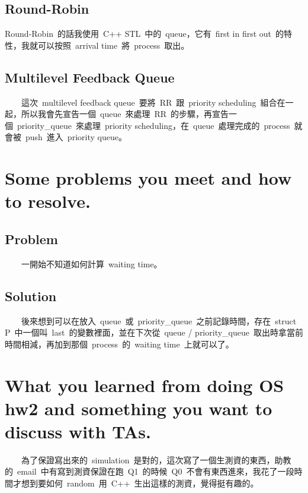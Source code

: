 \documentclass[12pt, a4paper]{article}
\begin{document}
\begin{CJK*}{UTF8}{bsmi}
        \subsection{Round-Robin}
            Round-Robin\ 的話我使用\ C++ STL\ 中的\ queue，它有\ first in first out\ 的特性，我就可以按照\ arrival time\ 將\ process\ 取出。

        \subsection{Multilevel Feedback Queue}
            　　這次\ multilevel feedback queue\ 要將\ RR\ 跟\ priority scheduling\ 組合在一起，所以我會先宣告一個\ queue\ 來處理\ RR\ 的步驟，再宣告一個\ priority\_queue\ 來處理\ priority scheduling，在\ queue\ 處理完成的\ process\ 就會被\ push\ 進入\ priority queue。

    \section{Some problems you meet and how to resolve.}
        \subsection{Problem}
        　　一開始不知道如何計算\ waiting time。
        \subsection{Solution}
        　　後來想到可以在放入\ queue\ 或\ priority\_queue\ 之前記錄時間，存在\ struct P\ 中一個叫\ last\ 的變數裡面，並在下次從\ queue / priority\_queue\ 取出時拿當前時間相減，再加到那個\ process\ 的\ waiting time\ 上就可以了。

    \section{What you learned from doing OS hw2 and something you want to discuss with TAs.}
        　　為了保證寫出來的\ simulation\ 是對的，這次寫了一個生測資的東西，助教的\ email\ 中有寫到測資保證在跑\ Q1\ 的時候\ Q0\ 不會有東西進來，我花了一段時間才想到要如何\ random\ 用\ C++\ 生出這樣的測資，覺得挺有趣的。
        


    \end{CJK*}
\end{document}
